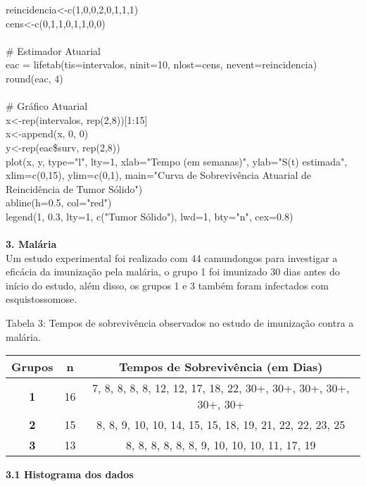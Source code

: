 \documentclass[12pt,a4paper]{article}
\begin{document}
	reincidencia<-c(1,0,0,2,0,1,1,1)\\
	cens<-c(0,1,1,0,1,1,0,0)\\
	\vspace{0.25cm}\\
	\# Estimador Atuarial\\
	eac = lifetab(tis=intervalos, ninit=10, nlost=cens, nevent=reincidencia)
	round(eac, 4)\\
	\vspace{0.25cm}\\
	\# Gráfico Atuarial\\
	x<-rep(intervalos, rep(2,8))[1:15]\\
	x<-append(x, 0, 0)\\
	y<-rep(eac\$surv, rep(2,8))\\
	plot(x, y, type="l", lty=1, xlab="Tempo (em semanas)", ylab="S(t) estimada", xlim=c(0,15), ylim=c(0,1), main="Curva de Sobrevivência Atuarial de Reincidência de Tumor Sólido")\\
	abline(h=0.5, col="red")\\
	legend(1, 0.3, lty=1, c("Tumor Sólido"), lwd=1, bty="n", cex=0.8)\\
	\vspace{1cm}\\
	\textbf{3. Malária}
	\vspace{0.5cm}\\
	Um estudo experimental foi realizado com 44 camundongos para investigar a eficácia da imunização pela malária, o grupo 1 foi imunizado 30 dias antes do início do estudo, além disso, os grupos 1 e 3 também foram infectados com esquistossomose.
	\begin{center}
		\small{Tabela 3: Tempos de sobrevivência observados no estudo de imunização contra a malária.}\\
		\begin{tabular}{|c|c|c|}\hline
			\textbf{Grupos} & \textbf{n} & \textbf{Tempos de Sobrevivência (em Dias)}\\ \hline
			\textbf{1} & 16 & 7, 8, 8, 8, 8, 12, 12, 17, 18, 22, 30+, 30+, 30+, 30+, 30+, 30+\\ \hline
			\textbf{2} & 15 & 8, 8, 9, 10, 10, 14, 15, 15, 18, 19, 21, 22, 22, 23, 25\\ \hline
			\textbf{3} & 13 & 8, 8, 8, 8, 8, 8, 9, 10, 10, 10, 11, 17, 19\\ \hline
		\end{tabular}
	\end{center}
	\vspace{1cm}
	\textbf{3.1 Histograma dos dados}
\end{document}
